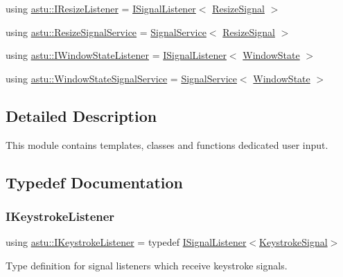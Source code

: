 \begin{DoxyCompactItemize}
using \hyperlink{group__input__group_ga643e71e95d0724fed5787e35e83fc1dd}{astu\+::\+I\+Resize\+Listener} = \hyperlink{classastu_1_1ISignalListener}{I\+Signal\+Listener}$<$ \hyperlink{classastu_1_1ResizeSignal}{Resize\+Signal} $>$
\item 
using \hyperlink{group__input__group_ga5949d03cd17e1fe53096ce501f2eb408}{astu\+::\+Resize\+Signal\+Service} = \hyperlink{classastu_1_1SignalService}{Signal\+Service}$<$ \hyperlink{classastu_1_1ResizeSignal}{Resize\+Signal} $>$
\item 
using \hyperlink{group__input__group_ga6552730babe8f256434adff50c8f5c7e}{astu\+::\+I\+Window\+State\+Listener} = \hyperlink{classastu_1_1ISignalListener}{I\+Signal\+Listener}$<$ \hyperlink{classastu_1_1WindowState}{Window\+State} $>$
\item 
using \hyperlink{group__input__group_ga6a683efe6c88e7ffcb0e912c5395bbc0}{astu\+::\+Window\+State\+Signal\+Service} = \hyperlink{classastu_1_1SignalService}{Signal\+Service}$<$ \hyperlink{classastu_1_1WindowState}{Window\+State} $>$
\end{DoxyCompactItemize}


\subsection{Detailed Description}
This module contains templates, classes and functions dedicated user input. 



\subsection{Typedef Documentation}
\mbox{\label{group__input__group_ga7eab1e88bb924ed418fa54cb663031e3}} 
\subsubsection{\texorpdfstring{I\+Keystroke\+Listener}{IKeystrokeListener}}
{\footnotesize\ttfamily using \hyperlink{group__input__group_ga7eab1e88bb924ed418fa54cb663031e3}{astu\+::\+I\+Keystroke\+Listener} = typedef \hyperlink{classastu_1_1ISignalListener}{I\+Signal\+Listener}$<$\hyperlink{classastu_1_1KeystrokeSignal}{Keystroke\+Signal}$>$}

Type definition for signal listeners which receive keystroke signals. \mbox{\label{group__input__group_ga8a311a2e19975ce6dca1696de117bd61}} 
